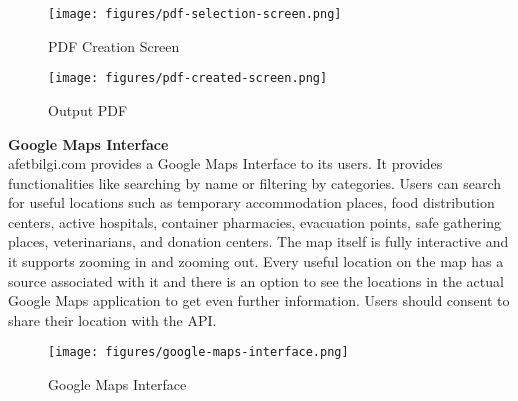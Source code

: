 \documentclass[listof=nochaptergap]{report}
\begin{document}
            \begin{center}
                \begin{figure}[H]
                    \centering
                    \texttt{[image: figures/pdf-selection-screen.png]}
                    \caption{PDF Creation Screen}
                    \label{fig:figure4}
                \end{figure}
            \end{center}

            \begin{center}
                \begin{figure}[H]
                    \centering
                    \texttt{[image: figures/pdf-created-screen.png]}
                    \caption{Output PDF}
                    \label{fig:figure5}
                \end{figure}
            \end{center}
            
            \textbf{Google Maps Interface} \\


            afetbilgi.com provides a Google Maps Interface to its users. 
            It provides functionalities like searching by name or filtering by categories. Users can search for useful locations such as temporary accommodation places, food distribution centers, active hospitals, container pharmacies, evacuation points, safe gathering places, veterinarians, and donation centers. The map itself is fully interactive and it supports zooming in and zooming out. Every useful location on the map has a source associated with it and there is an option to see the locations in the actual Google Maps application to get even further information. Users should consent to share their location with the API. 

            \begin{center}
                \begin{figure}[H]
                    \centering
                    \texttt{[image: figures/google-maps-interface.png]}
                    \caption{Google Maps Interface}
                    \label{fig:figure3}
                \end{figure}
            \end{center}
            
            \newpage
            
\end{document}
